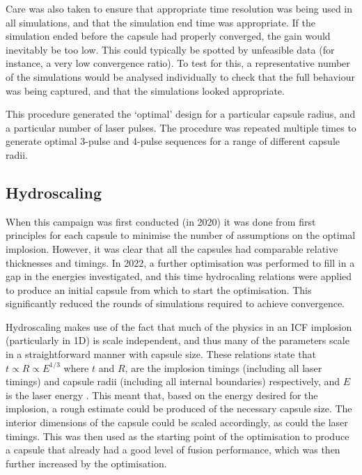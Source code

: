 Care was also taken to ensure that appropriate time resolution was being used in all simulations, and that the simulation end time was appropriate. If the simulation ended before the capsule had properly converged, the gain would inevitably be too low. This could typically be spotted by unfeasible data (for instance, a very low convergence ratio). To test for this, a representative number of the simulations would be analysed individually to check that the full behaviour was being captured, and that the simulations looked appropriate.

This procedure generated the `optimal' design for a particular capsule radius, and a particular number of laser pulses. The procedure was repeated multiple times to generate optimal 3-pulse and 4-pulse sequences for a range of different capsule radii.

\subsection{Hydroscaling}

When this campaign was first conducted (in 2020) it was done from first principles for each capsule to minimise the number of assumptions on the optimal implosion. However, it was clear that all the capsules had comparable relative thicknesses and timings. In 2022, a further optimisation was performed to fill in a gap in the energies investigated, and this time hydrocaling relations were applied to produce an initial capsule from which to start the optimisation. This significantly reduced the rounds of simulations required to achieve convergence.

Hydroscaling makes use of the fact that much of the physics in an ICF implosion (particularly in 1D) is scale independent, and thus many of the parameters scale in a straightforward manner with capsule size. These relations state that $t \propto R \propto E^{1/3}$ where $t$ and $R$, are the implosion timings (including all laser timings) and capsule radii (including all internal boundaries) respectively, and $E$ is the laser energy \cite{Nora2014}. This meant that, based on the energy desired for the implosion, a rough estimate could be produced of the necessary capsule size. The interior dimensions of the capsule could be scaled accordingly, as could the laser timings. This was then used as the starting point of the optimisation to produce a capsule that already had a good level of fusion performance, which was then further increased by the optimisation.

